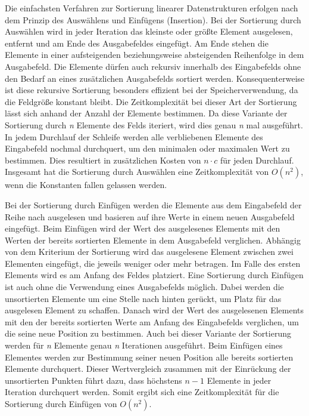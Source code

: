 Die einfachsten Verfahren zur Sortierung linearer Datenstrukturen erfolgen nach dem Prinzip des Auswählens und Einfügens (Insertion). Bei der Sortierung durch Auswählen wird in jeder Iteration das kleinste oder größte Element ausgelesen, entfernt und am Ende des Ausgabefeldes eingefügt. Am Ende stehen die Elemente in einer aufsteigenden beziehungsweise absteigenden Reihenfolge in dem Ausgabefeld. Die Elemente dürfen auch rekursiv innerhalb des Eingabefelds ohne den Bedarf an eines zusätzlichen Ausgabefelds sortiert werden. Konsequenterweise ist diese rekursive Sortierung besonders effizient bei der Speicherverwendung, da die Feldgröße konstant bleibt. Die Zeitkomplexität bei dieser Art der Sortierung lässt sich anhand der Anzahl der Elemente bestimmen. Da diese Variante der Sortierung durch \textit{n} Elemente des Felds iteriert, wird dies genau \textit{n} mal ausgeführt. In jedem Durchlauf der Schleife werden alle verbliebenen Elemente des Eingabefeld nochmal durchquert, um den minimalen oder maximalen Wert zu bestimmen. Dies resultiert in zusätzlichen Kosten von $n\cdot c$ für jeden Durchlauf. Insgesamt hat die Sortierung durch Auswählen eine Zeitkomplexität von $O(n^2)$, wenn die Konstanten fallen gelassen werden. \autocite[156]{sanders_sequential_2019} \autocite[212]{hubwieser_fundamente_2015}

Bei der Sortierung durch Einfügen werden die Elemente aus dem Eingabefeld der Reihe nach ausgelesen und basieren auf ihre Werte in einem neuen Ausgabefeld eingefügt. Beim Einfügen wird der Wert des ausgelesenes Elements mit den Werten der bereits sortierten Elemente in dem Ausgabefeld verglichen. Abhängig von dem Kriterium der Sortierung wird das ausgelesene Element zwischen zwei Elementen eingefügt, die jeweils weniger oder mehr betragen. Im Falle des ersten Elements wird es am Anfang des Feldes platziert. Eine Sortierung durch Einfügen ist auch ohne die Verwendung eines Ausgabefelds möglich. Dabei werden die unsortierten Elemente um eine Stelle nach hinten gerückt, um Platz für das ausgelesen Element zu schaffen. Danach wird der Wert des ausgelesenen Elements mit den der bereits sortierten Werte am Anfang des Eingabefelds verglichen, um die seine neue Position zu bestimmen. Auch bei dieser Variante der Sortierung werden für \textit{n} Elemente genau \textit{n} Iterationen ausgeführt. Beim Einfügen eines Elementes werden zur Bestimmung seiner neuen Position alle bereits sortierten Elemente durchquert. Dieser Wertvergleich zusammen mit der Einrückung der unsortierten Punkten führt dazu, dass höchstens \textit{$n-1$} Elemente in jeder Iteration durchquert werden. Somit ergibt sich eine Zeitkomplexität für die Sortierung durch Einfügen von $O(n^2)$. \autocite[157]{sanders_sequential_2019} \autocite[210-211]{hubwieser_fundamente_2015}

